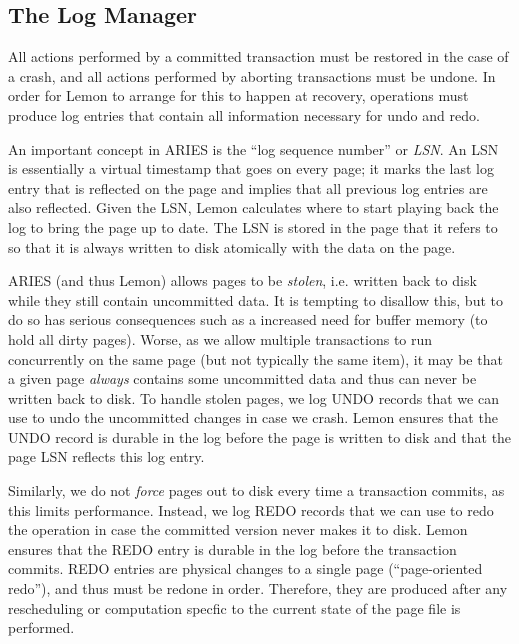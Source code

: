 \documentclass[letterpaper,twocolumn,english]{article}
\newcommand{\yad}{Lemon\xspace}
\begin{document}

\subsection{The Log Manager}

All actions performed by a committed transaction must be
restored in the case of a crash, and all actions performed by aborting
transactions must be undone. In order for \yad to arrange for this
to happen at recovery, operations must produce log entries that contain
all information necessary for undo and redo.

An important concept in ARIES is the ``log sequence number'' or {\em
LSN}.  An LSN is essentially a virtual timestamp that goes on every
page; it marks the last log entry that is reflected on the page and
implies that all previous log entries are also reflected.  Given the
LSN, \yad calculates where to start playing back the log to bring the
page up to date.  The LSN is stored in the page that it refers to so
that it is always written to disk atomically with the data on the
page.

ARIES (and thus \yad) allows pages to be {\em stolen}, i.e. written
back to disk while they still contain uncommitted data.  It is
tempting to disallow this, but to do so has serious consequences such as
a increased need for buffer memory (to hold all dirty pages). Worse,
as we allow multiple transactions to run concurrently on the same page
(but not typically the same item), it may be that a given page {\em
always} contains some uncommitted data and thus can never be written
back to disk.  To handle stolen pages, we log UNDO records that
we can use to undo the uncommitted changes in case we crash.  \yad
ensures that the UNDO record is durable in the log before the
page is written to disk and that the page LSN reflects this log entry.

Similarly, we do not {\em force} pages out to disk every time a transaction
commits, as this limits performance.  Instead, we log REDO records
that we can use to redo the operation in case the committed version never
makes it to disk.  \yad ensures that the REDO entry is durable in the
log before the transaction commits.  REDO entries are physical changes
to a single page (``page-oriented redo''), and thus must be redone in
order.  Therefore, they are produced after any rescheduling or computation
specfic to the current state of the page file is performed.
\end{document}
